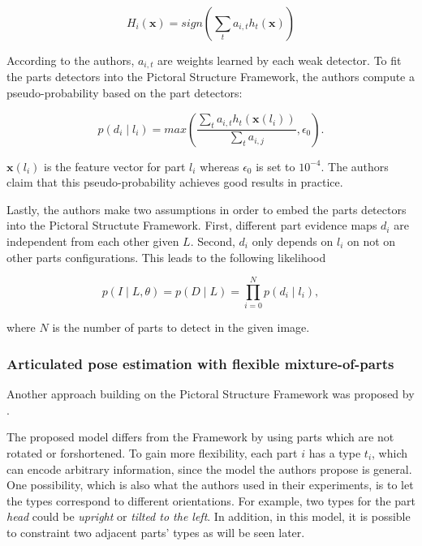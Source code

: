 \begin{equation}
    H_i(\bm{x}) = sign\left(\sum_t a_{i,t} h_t(\bm{x})\right)
\end{equation}

According to the authors, $a_{i,t}$ are weights learned by each weak detector.
To fit the parts detectors into the Pictoral Structure Framework, the authors compute a pseudo-probability based on the part detectors:

\begin{equation}
    p(d_i \mid l_i) = max \left(\frac{\sum_t a_{i,t} h_t(\bm{x}(l_i))}{\sum_t a_{i,j}}, \epsilon_0 \right).
\end{equation}

$\bm{x}(l_i)$ is the feature vector for part $l_i$ whereas $\epsilon_0$ is set to $10^{-4}$.
The authors claim that this pseudo-probability achieves good results in practice.

Lastly, the authors make two assumptions in order to embed the parts detectors into the Pictoral Structute Framework.
First, different part evidence maps $d_i$ are independent from each other given $L$.
Second, $d_i$ only depends on $l_i$ on not on other parts configurations.
This leads to the following likelihood

\begin{equation}
    p(I \mid L, \theta) = p(D \mid L) = \prod_{i=0}^N p(d_i \mid l_i),
\end{equation}

where $N$ is the number of parts to detect in the given image.




\subsubsection{Articulated pose estimation with flexible mixture-of-parts}

Another approach building on the Pictoral Structure Framework was proposed by \cite{yang_articulated_2011}.

The proposed model differs from the Framework by using parts which are not rotated or forshortened.
To gain more flexibility, each part $i$ has a type $t_i$, which can encode arbitrary information, since the model the authors propose is general.
One possibility, which is also what the authors used in their experiments, is to let the types correspond to different orientations.
For example, two types for the part \textit{head} could be \textit{upright} or \textit{tilted to the left}.
In addition, in this model, it is possible to constraint two adjacent parts' types as will be seen later.

